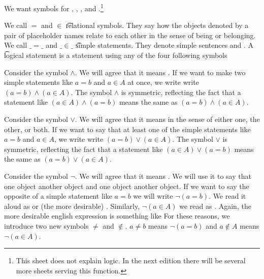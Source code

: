 

We want symbols for , , , and .\footnote{This sheet does not explain logic. In the next edition there will be several more sheets serving this function.}

%

We call $=$ and $\in$ \t{relational symbols}.
They say how the objects denoted by a pair of placeholder names relate to each other in the sense of being or belonging.
We call $\_=\_$ and $\_\in\_$ \t{simple statements}.
They denote simple sentences  and .
A \t{logical statement} is a statement using any of the four following symbols



Consider the symbol $\land$.
We will agree that it means .
If we want to make two simple statements like $a = b$ and $a \in A$ at once, we write write $(a = b) \land (a \in A)$.
The symbol $\land$ is symmetric, reflecting the fact that a statement like $(a \in A) \land (a = b)$ means the same as $(a = b) \land (a \in A)$.


Consider the symbol $\lor$.
We will agree that it means  in the sense of either one, the other, or both.
If we want to say that  at least one of the simple statements like $a = b$ and $a \in A$, we write write $(a = b) \lor (a \in A)$.
The symbol $\lor$ is symmetric, reflecting the fact that a statement like $(a \in A) \lor (a = b)$ means the same as $(a = b) \lor (a \in A)$.


Consider the symbol $\neg$.
We will agree that it means .
We will use it to say that one object  another object and one object  another object.
If we want to say the opposite of a simple statement like $a = b$ we will write $\neg(a = b)$.
We read it aloud as  or (the more desirable) .
Similarly, $\neg(a \in A)$ we read as .
Again, the more desirable english expression is something like 
For these reasons, we introduce two new symbols $\neq$ and $\not\in$.
$a \neq b$ means $\neg(a = b)$ and $a \not\in A$ means $\neg(a \in A)$.

